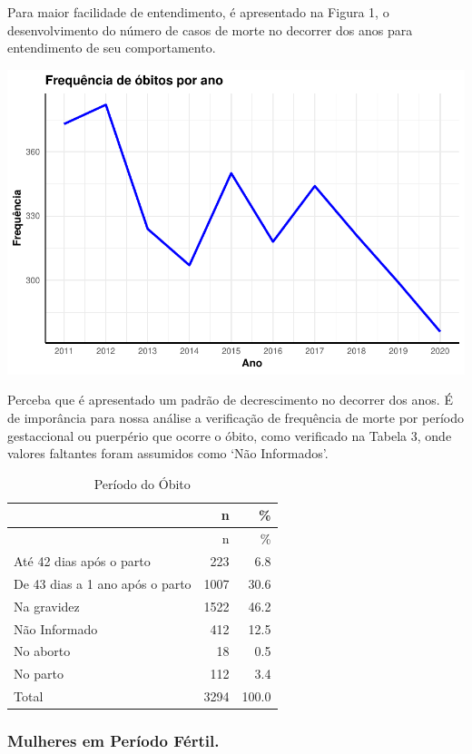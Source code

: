 \documentclass[
]{article}
\let\origfigure\figure
\let\endorigfigure\endfigure
\renewenvironment{figure}[1][2] {
    \expandafter\origfigure\expandafter[H]
} {
    \endorigfigure
}
\begin{document}
Para maior facilidade de entendimento, é apresentado na Figura 1, o
desenvolvimento do número de casos de morte no decorrer dos anos para
entendimento de seu comportamento.

\begin{figure}
\centering
\includegraphics{RelatorioV02_files/figure-latex/unnamed-chunk-2-1.pdf}
\caption{Frequência de obitos por ano grupo Gestantes e Puérperas}
\end{figure}

Perceba que é apresentado um padrão de decrescimento no decorrer dos
anos. É de imporância para nossa análise a verificação de frequência de
morte por período gestaccional ou puerpério que ocorre o óbito, como
verificado na Tabela 3, onde valores faltantes foram assumidos como `Não
Informados'.

\begin{longtable}[]{@{}lrr@{}}
\caption{Período do Óbito}\tabularnewline
\toprule()
& n & \% \\
\midrule()
\endfirsthead
\toprule()
& n & \% \\
\midrule()
\endhead
Até 42 dias após o parto & 223 & 6.8 \\
De 43 dias a 1 ano após o parto & 1007 & 30.6 \\
Na gravidez & 1522 & 46.2 \\
Não Informado & 412 & 12.5 \\
No aborto & 18 & 0.5 \\
No parto & 112 & 3.4 \\
Total & 3294 & 100.0 \\
\bottomrule()
\end{longtable}

\hypertarget{mulheres-em-peruxedodo-fuxe9rtil.}{%
\subsubsection{Mulheres em Período
Fértil.}\label{mulheres-em-peruxedodo-fuxe9rtil.}}
\end{document}
